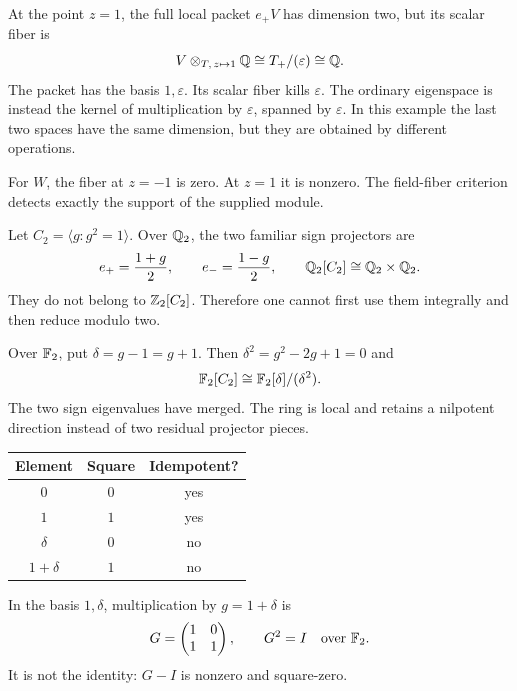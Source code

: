 At the point $z=1$, the full local packet $e_+V$ has dimension two, but its scalar fiber is
\[
V\otimes_{T,\,z\mapsto1}\mathbb Q
\cong T_+/(\varepsilon)\cong\mathbb Q.
\]
The packet has the basis $1,\varepsilon$. Its scalar fiber kills $\varepsilon$. The ordinary eigenspace is instead the kernel of multiplication by $\varepsilon$, spanned by $\varepsilon$. In this example the last two spaces have the same dimension, but they are obtained by different operations.

For $W$, the fiber at $z=-1$ is zero. At $z=1$ it is nonzero. The field-fiber criterion detects exactly the support of the supplied module.


Let $C_2=\langle g:g^2=1\rangle$. Over $\mathbb Q_2$, the two familiar sign projectors are
\[
e_+=\frac{1+g}{2},\qquad e_-=\frac{1-g}{2},
\qquad \mathbb Q_2[C_2]\cong\mathbb Q_2\times\mathbb Q_2.
\]
They do not belong to $\mathbb Z_2[C_2]$. Therefore one cannot first use them integrally and then reduce modulo two.

Over $\mathbb F_2$, put $\delta=g-1=g+1$. Then $\delta^2=g^2-2g+1=0$ and
\[
\mathbb F_2[C_2]\cong\mathbb F_2[\delta]/(\delta^2).
\]
The two sign eigenvalues have merged. The ring is local and retains a nilpotent direction instead of two residual projector pieces.

\begin{minipage}[c]{.48\linewidth}
\centering
\begin{tabular}{@{}ccc@{}}\toprule
Element & Square & Idempotent?\\\midrule
$0$ & $0$ & yes\\
$1$ & $1$ & yes\\
$\delta$ & $0$ & no\\
$1+\delta$ & $1$ & no\\\bottomrule
\end{tabular}
\end{minipage}\hfill
\begin{minipage}[c]{.47\linewidth}
In the basis $1,\delta$, multiplication by $g=1+\delta$ is
\[
G=\begin{pmatrix}1&0\\1&1\end{pmatrix},\qquad
G^2=I\quad\text{over }\mathbb F_2.
\]
It is not the identity: $G-I$ is nonzero and square-zero.
\end{minipage}


